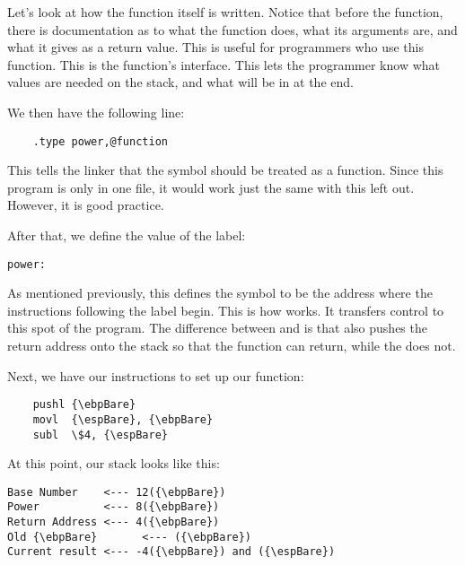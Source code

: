 Let's look at how the function itself is written.  Notice
that before the function, there is documentation as to
what the function does, what its arguments are, and
what it gives as a return value.  This is useful for 
programmers who use this function.  This is the function's
interface.  This lets the programmer know what values are
needed on the stack, and what will be in {\eaxReg} at the end.

We then have the following line:

\begin{simpletyping}
\begin{lstlisting}
	.type power,@function
\end{lstlisting}
\end{simpletyping}

This tells the linker that the symbol 
should be treated as a function.  Since this program
is only in one file, it would work just the same with this
left out.  However, it is good practice.

After that, we define the value of the  label:

\begin{simpletyping}
\begin{lstlisting}
power:
\end{lstlisting}
\end{simpletyping}

As mentioned previously, this defines the symbol 
 to be the address where the instructions
following the label begin.  This is how 
 works.  It transfers control to
this spot of the program.  The difference between 
 and  is that 
 also pushes the return address onto
the stack so that the function can return, while the 
 does not.

Next, we have our instructions to set up our function:

\begin{simpletyping}
\begin{lstlisting}
	pushl {\ebpBare}
	movl  {\espBare}, {\ebpBare}
	subl  \$4, {\espBare}
\end{lstlisting}
\end{simpletyping}

At this point, our stack looks like this:

\begin{simpletyping}
\begin{lstlisting}
Base Number    <--- 12({\ebpBare})
Power          <--- 8({\ebpBare})
Return Address <--- 4({\ebpBare})
Old {\ebpBare}       <--- ({\ebpBare})
Current result <--- -4({\ebpBare}) and ({\espBare})
\end{lstlisting}
\end{simpletyping}


